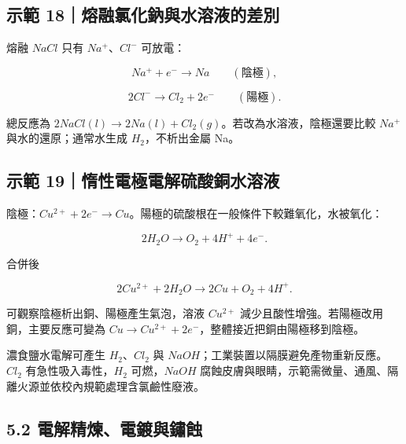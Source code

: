 \documentclass[11pt,a4paper]{article}
\begin{document}
\begin{HandoutWorkedExample}

\subsection{示範 18｜熔融氯化鈉與水溶液的差別}\label{ux793aux7bc4-18ux7194ux878dux6c2fux5316ux9209ux8207ux6c34ux6eb6ux6db2ux7684ux5deeux5225}

熔融 \(NaCl\) 只有 \(Na^+\)、\(Cl^-\) 可放電：

\[
Na^++e^-\rightarrow Na\qquad(\text{陰極}),
\]

\[
2Cl^-\rightarrow Cl_2+2e^-\qquad(\text{陽極}).
\]

總反應為 \(2NaCl(l)\rightarrow2Na(l)+Cl_2(g)\)。若改為水溶液，陰極還要比較 \(Na^+\) 與水的還原；通常水生成 \(H_2\)，不析出金屬 Na。

\end{HandoutWorkedExample}

\begin{HandoutWorkedExample}

\subsection{示範 19｜惰性電極電解硫酸銅水溶液}\label{ux793aux7bc4-19ux60f0ux6027ux96fbux6975ux96fbux89e3ux786bux9178ux9285ux6c34ux6eb6ux6db2}

陰極：\(Cu^{2+}+2e^-\rightarrow Cu\)。陽極的硫酸根在一般條件下較難氧化，水被氧化：

\[
2H_2O\rightarrow O_2+4H^++4e^-.
\]

合併後

\[
2Cu^{2+}+2H_2O\rightarrow2Cu+O_2+4H^+.
\]

可觀察陰極析出銅、陽極產生氣泡，溶液 \(Cu^{2+}\) 減少且酸性增強。若陽極改用銅，主要反應可變為 \(Cu\rightarrow Cu^{2+}+2e^-\)，整體接近把銅由陽極移到陰極。

\end{HandoutWorkedExample}

濃食鹽水電解可產生 \(H_2\)、\(Cl_2\) 與 \(NaOH\)；工業裝置以隔膜避免產物重新反應。\(Cl_2\) 有急性吸入毒性，\(H_2\) 可燃，\(NaOH\) 腐蝕皮膚與眼睛，示範需微量、通風、隔離火源並依校內規範處理含氯鹼性廢液。

\subsection{5.2 電解精煉、電鍍與鏽蝕}\label{ux96fbux89e3ux7cbeux7149ux96fbux934dux8207ux93fdux8755}
\end{document}
